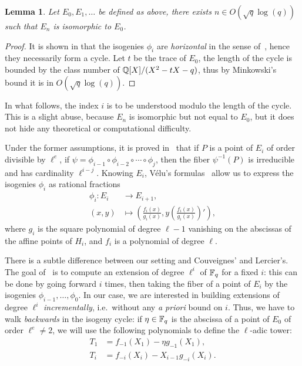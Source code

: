 \documentclass{sig-alternate}
\newtheorem{lemma}[definition]{Lemma}
\begin{document}
\begin{lemma}
  \label{th:class-number}
  Let $E_0,E_1,\dots$ be defined as above, there exists $n\in
  O(\sqrt{q}\log (q))$ such that $E_n$ is isomorphic to $E_0$.
\end{lemma}
\begin{proof}
  It is shown in \cite[\S~4]{couveignes+lercier11} that the
  isogenies $\phi_i$ are \emph{horizontal} in the sense
  of~\cite{kohel}, hence they necessarily form a cycle. Let $t$ be the
  trace of $E_0$, the length of the cycle is bounded by the class
  number of $\mathbb{Q}[X]/(X^2-tX-q)$, thus by Minkowski's bound it is in
  $O(\sqrt{q}\log (q))$.
\end{proof}

In what follows, the index $i$ is to be understood modulo the length of
the cycle. This is a slight abuse, because $E_n$ is isomorphic but not
equal to $E_0$, but it does not hide any theoretical or computational
difficulty.

Under the former assumptions, it is proved
in~\cite[\S~4]{couveignes+lercier11} that if $P$ is a point of
$E_i$ of order divisible by $\ell^e$, if
$\psi=\phi_{i-1}\circ\phi_{i-2}\circ\cdots\circ\phi_{j}$, then the
fiber $\psi^{-1}(P)$ is irreducible and has cardinality $\ell^{i-j}$.
Knowing $E_i$, Vélu's formulas~\cite{velu71} allow us to express the
isogenies $\phi_i$ as rational fractions
\begin{equation}
  \begin{aligned}
    \phi_i: E_i &\to E_{i+1},\\
    (x,y) &\mapsto \left(\frac{f_i(x)}{g_i(x)}, y\left(\frac{f_i(x)}{g_i(x)}\right)'\right),
  \end{aligned}
\end{equation}
where $g_i$ is the square polynomial of degree $\ell-1$ vanishing on
the abscissas of the affine points of $H_i$, and $f_i$ is a polynomial
of degree $\ell$. 

There is a subtle difference between our setting and Couveignes' and
Lercier's. The goal of~\cite{couveignes+lercier11} is to compute an
extension of degree $\ell^i$ of $\mathbb{F}_q$ for a fixed $i$: this can be
done by going forward $i$ times, then taking the fiber of a point of $E_i$ by
the isogenies $\phi_{i-1}, \ldots, \phi_0$. In our case, we are
interested in building extensions of degree $\ell^i$
\emph{incrementally}, i.e.\ without any \emph{a priori} bound on
$i$. Thus, we have to walk \emph{backwards} in the isogeny cycle: if
$\eta\in\mathbb{F}_q$ is the abscissa of a point of $E_0$ of order $\ell^e\ne
2$, we will use the following polynomials to define the $\ell$-adic
tower:
\begin{align*}
  T_1 &= f_{-1}(X_1) - \eta g_{-1}(X_1),\\ 
  T_i &= f_{-i}(X_i) - X_{i-1} g_{-i}(X_i).
\end{align*}
\end{document}
